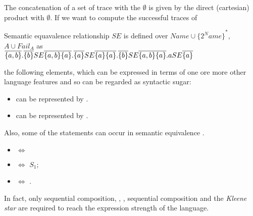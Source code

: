 The concatenation of a set of trace with the $\emptyset$ is given by the direct (cartesian) product with $\emptyset$. If we want to compute the successful traces of 

\iffull

\begin{definition}

Semantic equavalence relationship $SE$ is defined over $Name \cup {\{ 2^Name \}}^*$, $A \cup Fail_A$ as\\
\begin{math}
\\
\overline{\{a,b\}}.\overline{\{b\}} SE \overline{\{a,b\}}\\
\overline{\{a\}}.\overline{\{a\}} SE \overline{\{a\}}\\
\overline{\{a\}}.\overline{\{b\}} SE \overline{\{a,b\}}\\
\overline{\{a\}}.a SE \overline{\{a\}}\\
\end{math}
\end{definition}

the following elements, which can be expressed in terms of one ore more other language features and so can be regarded as syntactic sugar:

\begin{itemize}
\item {} can be represented by .
\item {} can be represented by .
\end{itemize}

Also, some of the statements can occur in semantic equivalence .

\begin{itemize}
\item {} $\Leftrightarrow$ 
\item {} $\Leftrightarrow$ $S_1;$
\item {} $\Leftrightarrow$ .
\end{itemize}

In fact, only sequential composition, \alap{}, \tryelse{}{}{}, sequential composition and the \emph{Kleene star} are required to reach the expression strength of the language.

\fi
\fi
